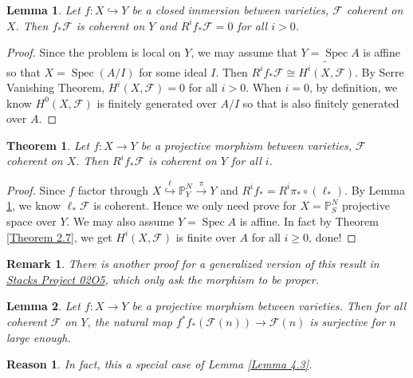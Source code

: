 \documentclass{ctexart}
\newtheorem{remark}{Remark}[section]
\newtheorem{theorem}{Theorem}[section]
\newtheorem{lemma}{Lemma}[section]
\newtheorem{reason}{Reason}[section]
\newcommand{\spec}{\operatorname{Spec}}
\begin{document}
\begin{lemma}
    Let $f: X \hookrightarrow Y$ be a closed immersion between varieties, $\mathcal{F}$ coherent on $X$.
    Then $f_{\ast}\mathcal{F}$ is coherent on $Y$ and $R^{i}f_{\ast}\mathcal{F} = 0$ for all $i > 0$.
    \label{Lemma 7.3}
\end{lemma}
\begin{proof}
    Since the problem is local on $Y$, we may assume that $Y = \spec A$ is affine so that $X = \spec (A/I)$ for some ideal $I$.
    Then $R^{i}f_{\ast}\mathcal{F} \cong \widetilde{H^{i}(X, \mathcal{F})}$.
    By Serre Vanishing Theorem, $H^{i}(X, \mathcal{F}) = 0$ for all $i > 0$.
    When $i = 0$, by definition, we know $H^{0}(X, \mathcal{F})$ is finitely generated over $A/I$ so that is also finitely generated over $A$.
\end{proof}
\begin{theorem}
    Let $f: X \rightarrow Y$ be a projective morphism between varieties, $\mathcal{F}$ coherent on $X$.
    Then $R^{i}f_{\ast}\mathcal{F}$ is coherent on $Y$ for all $i$.
    \label{Theorem 7.1}
\end{theorem}
\begin{proof}
    Since $f$ factor through $X \overset{\ell}{\hookrightarrow} \mathbb{P}_{Y}^{N} \overset{\pi}{\rightarrow} Y$ and $R^{i}f_{\ast} = R^{i}\pi_{\ast} \circ (\ell_{\ast})$.
    By Lemma \ref{Lemma 7.3}, we know $\ell_{\ast}\mathcal{F}$ is coherent.
    Hence we only need prove for $X = \mathbb{P}_{S}^{N}$ projective space over $Y$.
    We may also assume $Y = \spec A$ is affine.
    In fact by Theorem \ref{Theorem 2.7}, we get $H^{i}(X, \mathcal{F})$ is finite over $A$ for all $i \ge 0$, done!
\end{proof}
\begin{remark}
    There is another proof for a generalized version of this result in \href{https://stacks.math.columbia.edu/tag/02O5}{Stacks Project 02O5},
    which only ask the morphism to be proper.
\end{remark}
\begin{lemma}
    Let $f: X \rightarrow Y$ be a projective morphism between varieties.
    Then for all coherent $\mathcal{F}$ on $Y$, the natural map $f^{\ast}f_{\ast}(\mathcal{F}(n)) \rightarrow \mathcal{F}(n)$ is surjective for $n$ large enough.
    \label{Lemma 7.4}
\end{lemma}
\begin{reason}
    In fact, this a special case of Lemma \ref{Lemma 4.3}.
\end{reason}
\end{document}
